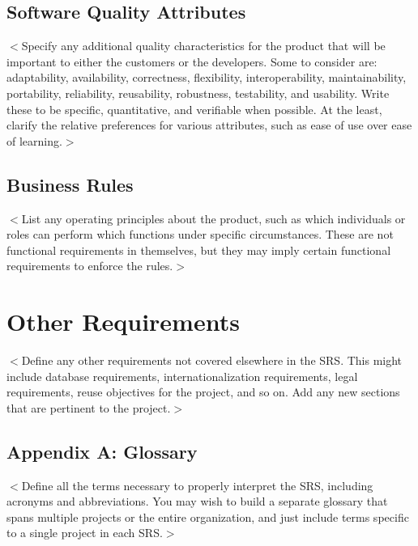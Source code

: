 \documentclass{scrreprt}
\begin{document}
\section{Software Quality Attributes}
$<$Specify any additional quality characteristics for the product that will be 
important to either the customers or the developers. Some to consider are: 
adaptability, availability, correctness, flexibility, interoperability, 
maintainability, portability, reliability, reusability, robustness, testability, 
and usability. Write these to be specific, quantitative, and verifiable when 
possible. At the least, clarify the relative preferences for various attributes, 
such as ease of use over ease of learning.$>$

\section{Business Rules}
$<$List any operating principles about the product, such as which individuals or 
roles can perform which functions under specific circumstances. These are not 
functional requirements in themselves, but they may imply certain functional 
requirements to enforce the rules.$>$


\chapter{Other Requirements}
$<$Define any other requirements not covered elsewhere in the SRS. This might 
include database requirements, internationalization requirements, legal 
requirements, reuse objectives for the project, and so on. Add any new sections 
that are pertinent to the project.$>$


\section{Appendix A: Glossary}
$<$Define all the terms necessary to properly interpret the SRS, including 
acronyms and abbreviations. You may wish to build a separate glossary that spans 
multiple projects or the entire organization, and just include terms specific to 
a single project in each SRS.$>$
\end{document}
